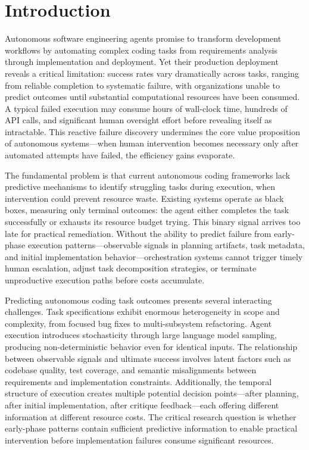 \documentclass[]{article}
\begin{document}
\section{Introduction}
\label{sec:intro}


Autonomous software engineering agents promise to transform development workflows by automating complex coding tasks from requirements analysis through implementation and deployment. Yet their production deployment reveals a critical limitation: success rates vary dramatically across tasks, ranging from reliable completion to systematic failure, with organizations unable to predict outcomes until substantial computational resources have been consumed. A typical failed execution may consume hours of wall-clock time, hundreds of API calls, and significant human oversight effort before revealing itself as intractable. This reactive failure discovery undermines the core value proposition of autonomous systems—when human intervention becomes necessary only after automated attempts have failed, the efficiency gains evaporate.

The fundamental problem is that current autonomous coding frameworks lack predictive mechanisms to identify struggling tasks during execution, when intervention could prevent resource waste. Existing systems operate as black boxes, measuring only terminal outcomes: the agent either completes the task successfully or exhausts its resource budget trying. This binary signal arrives too late for practical remediation. Without the ability to predict failure from early-phase execution patterns—observable signals in planning artifacts, task metadata, and initial implementation behavior—orchestration systems cannot trigger timely human escalation, adjust task decomposition strategies, or terminate unproductive execution paths before costs accumulate.

Predicting autonomous coding task outcomes presents several interacting challenges. Task specifications exhibit enormous heterogeneity in scope and complexity, from focused bug fixes to multi-subsystem refactoring. Agent execution introduces stochasticity through large language model sampling, producing non-deterministic behavior even for identical inputs. The relationship between observable signals and ultimate success involves latent factors such as codebase quality, test coverage, and semantic misalignments between requirements and implementation constraints. Additionally, the temporal structure of execution creates multiple potential decision points—after planning, after initial implementation, after critique feedback—each offering different information at different resource costs. The critical research question is whether early-phase patterns contain sufficient predictive information to enable practical intervention before implementation failures consume significant resources.
\end{document}
